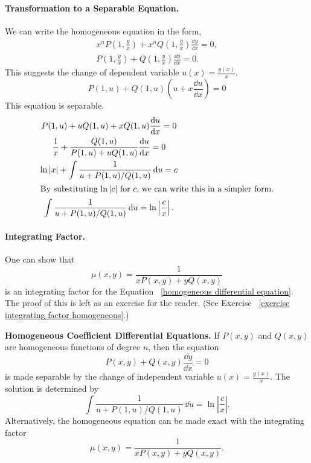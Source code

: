 \paragraph{Transformation to a Separable Equation.}
We can write the homogeneous equation in the form,
\begin{gather*}
  x^n P \left(1, \frac{y}{x} \right) 
  + x^n Q \left(1, \frac{y}{x} \right) \frac{\dd y}{\dd x} = 0, 
  \\
  P \left(1, \frac{y}{x} \right) 
  + Q \left(1, \frac{y}{x} \right) \frac{\dd y}{\dd x} = 0.
\end{gather*}
This suggests the change of dependent variable $u(x) = \frac{y(x)}{x}$.
\[
P(1, u) + Q(1, u) \left( u + x \frac{\dd u}{\dd x} \right) = 0
\]
This equation is separable.
\begin{gather*}
  P(1, u) + u Q(1, u) + x Q(1, u) \frac{\mathrm{d} u}{\mathrm{d} x} = 0 
  \\
  \frac{1}{x} + \frac{Q(1, u)}{P(1, u) + u Q(1, u)} \frac{\mathrm{d} u}{\mathrm{d} x} = 0 
  \\
  \ln |x| + \int \frac{1}{u + P(1, u) / Q(1, u)} \,\mathrm{d} u = c 
  \\
  \intertext{By substituting $\ln |c|$ for $c$, we can write this in a 
    simpler form.}
  \int \frac{1}{u + P(1, u) / Q(1, u)} \,\mathrm{d} u = \ln \left| \frac{c}{x} \right|.
\end{gather*}


\paragraph{Integrating Factor.}
One can show that
\[
\mu(x,y) = \frac{1}{x P(x,y) + y Q(x,y)}
\]
is an integrating factor for the Equation~
\ref{homogeneous differential equation}.  The proof of this is left as 
an exercise for the reader.  (See Exercise~
\ref{exercise integrating factor homogeneous}.)





\begin{Result}
  \textbf{Homogeneous Coefficient Differential Equations.}
  If $P(x, y)$ and $Q(x, y)$ are homogeneous functions of degree $n$, then
  the equation 
  \[
  P(x, y) + Q(x, y) \frac{\dd y}{\dd x} = 0
  \]
  is made separable by the change of independent variable 
  $u(x) = \frac{y(x)}{x}$.  The solution is determined by
  \[
  \int \frac{1}{u + P(1, u) / Q(1, u)} \,\dd u = \ln \left| \frac{c}{x} \right|.
  \]
  Alternatively, the homogeneous equation can be made exact with the 
  integrating factor
  \[
  \mu(x,y) = \frac{1}{x P(x,y) + y Q(x,y)}.
  \]
\end{Result}








